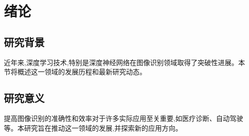 \chapter{绪论}
\section{研究背景}
近年来,深度学习技术,特别是深度神经网络在图像识别领域取得了突破性进展。本节将概述这一领域的发展历程和最新研究动态\cite{krizhevsky2012imagenet,goodfellow2014generative}。

\section{研究意义}
提高图像识别的准确性和效率对于许多实际应用至关重要,如医疗诊断、自动驾驶等。本研究旨在推动这一领域的发展,并探索新的应用方向。



